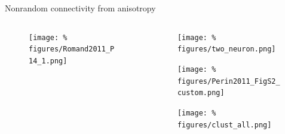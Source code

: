 \begin{frame}{Nonrandom connectivity from anisotropy}
  \begin{columns}
    \begin{column}{.45\textwidth}
      \minipage[c][0.75\textheight][s]{\columnwidth}
      
      \begin{figure}
        \centering
        \texttt{[image: \%
          figures/Romand2011\_P14\_1.png]} %
      \end{figure}
      
      
      \endminipage      
    \end{column}
    \begin{column}{.55\textwidth}


      \vspace{-0.2cm}
      
      \begin{figure}
        \centering
        \texttt{[image: \%
          figures/two\_neuron.png]} %
      \end{figure}

      \vfill
      

      \begin{figure}
        \centering
        \texttt{[image: \%
        figures/Perin2011\_FigS2\_custom.png]} %
      \end{figure}

      \vfill
      

      \begin{figure}
        \centering
        \texttt{[image: \%
          figures/clust\_all.png]} %
      \end{figure}
      
      \vfill

      
    \end{column}
  \end{columns}

  
\end{frame}


